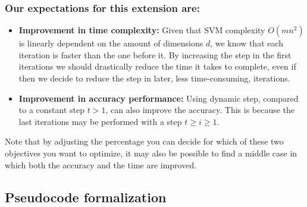 \subsubsection*{Our expectations for this extension are:}

\begin{itemize}
    \item \textbf{Improvement in time complexity:} Given that SVM complexity $O(mn^2)$ is lin\-ear\-ly dependent on the amount of dimensions $d$, we know that each iteration is faster than the one before it. By increasing the step in the first iterations we should drastically reduce the time it takes to complete, even if then we decide to reduce the step in later, less time-consuming, iterations.
    \item \textbf{Improvement in accuracy performance:} Using dynamic step, compared to a constant step $t > 1$, can also improve the accuracy. This is because the last iterations may be performed with a step $t \ge i \ge 1$.
\end{itemize}

Note that by adjusting the percentage you can decide for which of these two objectives you want to optimize, it may also be possible to find a middle case in which both the accuracy and the time are improved.

\subsection{Pseudocode formalization}

